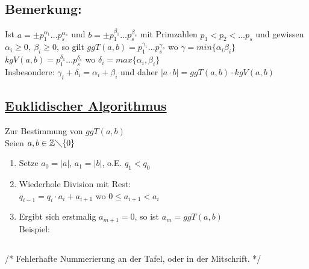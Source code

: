 \subsection{Bemerkung:}
Ist $a = \pm p^{\alpha_{1}}_{1} \dotsc p^{\alpha_{s}}_{s}$ und $b = \pm p^{\beta_{1}}_{1} \dotsc p^{\beta_{s}}_{s}$ mit Primzahlen $p_{1} < p_{2} < \dotsc p_{s}$ und gewissen $\alpha_{i} \geq 0, \ \beta_{i} \geq 0$, so gilt $ggT(a,b) = p^{\gamma_{1}}_{1} \dotsc p^{\gamma_{s}}_{s}$ wo $\gamma = min\{\alpha_{i}\beta_{i}\}$\\
$kgV(a,b) = p^{\delta_{1}}_{1} \dotsc p^{\delta_{s}}_{s}$ wo $\delta_{i} = max\{ \alpha_{i}, \beta_{i}\}$\\
Insbesondere: $\gamma_{i} + \delta_{i} = \alpha_{i} + \beta_{i}$ und daher $|a\cdot b| = ggT(a,b) \cdot kgV(a,b)$
%
%
%
\subsection{\underline{Euklidischer Algorithmus}}
Zur Bestimmung von $ggT(a,b)$\\
Seien $a,b \in \mathbb{Z} \diagdown\{0\}$
	\begin{enumerate}
		\item Setze $a_{0} = |a|$, $a_{1} = |b|$, o.E. $q_{1} < q_{0}$
		\item Wiederhole Division mit Rest:\\
			$q_{i-1} = q_{i} \cdot a_{i} + a_{i+1}$ wo $0 \leq a_{i+1} <a_{i}$
		\item Ergibt sich erstmalig $a_{m+1} = 0$, so ist $a_{m} = ggT(a,b)$\\
			Beispiel:
	\end{enumerate}
%
%
%
\subsection{ } /* Fehlerhafte Nummerierung an der Tafel, oder in der Mitschrift. */
%
%
%

